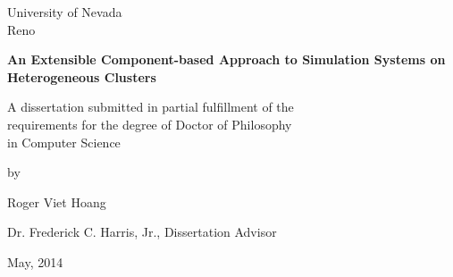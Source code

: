 \setcounter{page}{0}
\thispagestyle{empty}

\begin{center}
University of Nevada\\
Reno

\vfill


{\Large \bf An Extensible Component-based Approach to Simulation Systems on Heterogeneous Clusters\\ \vspace{0.05in}}
\vfill

A dissertation submitted in partial fulfillment of the\\
requirements for the degree of Doctor of Philosophy\\
in Computer Science

\vfill

by

\vspace{0.5in}

Roger Viet Hoang

\vspace{0.5in}

Dr. Frederick C. Harris, Jr., Dissertation Advisor

\vspace{0.5in}

May, 2014
\end{center}
